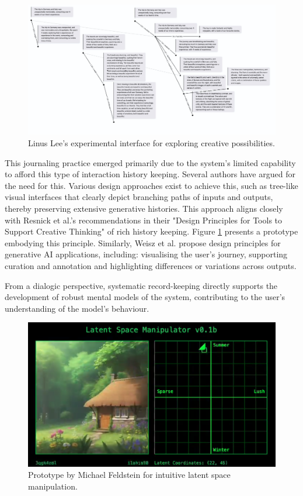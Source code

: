 \begin{figure}[H]
\centering
\includegraphics[width=0.8\linewidth]{linus.png}
\caption{Linus Lee's experimental interface for exploring creative possibilities.}
\label{fig:linus}
\end{figure}

This journaling practice emerged primarily due to the system's limited capability to afford this type of interaction history keeping. Several authors have argued for the need for this. Various design approaches exist to achieve this, such as tree-like visual interfaces that clearly depict branching paths of inputs and outputs, thereby preserving extensive generative histories. This approach aligns closely with Resnick et al.'s recommendations in their "Design Principles for Tools to Support Creative Thinking" \cite{Resnick2005-fs} of rich history keeping. Figure \ref{fig:linus} presents a prototype embodying this principle. Similarly, Weisz et al. propose design principles for generative AI applications, including: visualising the user's journey, supporting curation and annotation and highlighting differences or variations across outputs.

From a dialogic perspective, systematic record-keeping directly supports the development of robust mental models of the system, contributing to the user's understanding of the model's behaviour.

\begin{figure}[H]
\centering
\includegraphics[width=0.8\linewidth]{latentspacemanip.png}
\caption{Prototype by Michael Feldstein for intuitive latent space manipulation.}
\label{fig:feldstein}
\end{figure}

